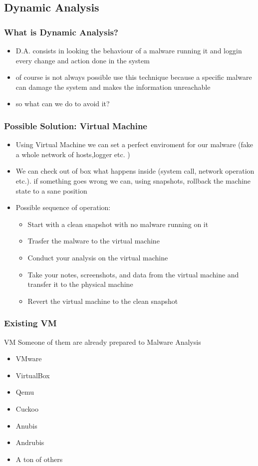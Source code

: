 \documentclass[]{beamer}
\begin{document}
	\subsection{Dynamic Analysis}
		\begin{frame}
			\frametitle{What is Dynamic Analysis?}
			\begin{itemize}
				\item {D.A. consists in  looking the behaviour of a malware running it and loggin every change and action done in the system}
				\item {of course is not always possible use this technique because a specific malware can damage the system and makes the information unreachable}
				\item {so what can we do to avoid it?}
			\end{itemize}
		\end{frame}
		\begin{frame}
			\frametitle{Possible Solution: Virtual Machine}
			\begin{itemize}
				\item {Using Virtual Machine we can set a perfect enviroment for our malware (fake a whole network of hosts,logger etc. )}
				\item {We can check out of box what happens inside (system call, network operation etc.).\newline
					if something goes wrong we can, using snapshots, rollback the machine state to a sane position					    }
				\item {Possible sequence of operation:}
					\begin{itemize}
						\item{Start with a clean snapshot with no malware running on it}
						\item{Trasfer the malware to the virtual machine}
						\item{Conduct your analysis on the virtual machine}
						\item{Take your notes, screenshots, and data from the virtual machine and transfer it to the physical machine}
						\item{Revert the virtual machine to the clean snapshot}			
					\end{itemize}	
			\end{itemize}
		\end{frame}
		\begin{frame}
			\frametitle{Existing VM}
			\begin{block}{VM}
				Someone of them are already prepared to Malware Analysis	
				\begin{itemize}
					\item{VMware}
					\item{VirtualBox}
					\item{Qemu}
					\item{Cuckoo}
					\item{Anubis}
					\item{Andrubis}
					\item{A ton of others}
				\end{itemize}
			\end{block}
		\end{frame}
\end{document}

